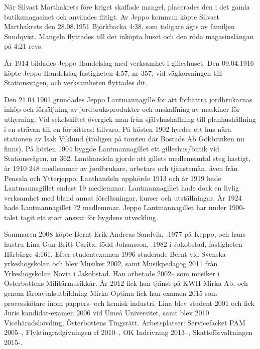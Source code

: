 När Silvast Marthakrets före kriget skaffade mangel, placerades den i det gamla butiksmagasinet och användes flitigt. Av Jeppo kommun köpte Silvast Marthakrets den 28.08.1951 Björkbacka 4:38, som tidigare ägts av familjen Sundqvist. Mangeln flyttades till det inköpta huset och den röda magasinslängan på 4:21 revs.


År 1914 bildades Jeppo Handelslag med verksamhet i gilleshuset. Den 09.04.1916 köpte Jeppo Handelslag fastigheten 4:57, nr 357, vid vägkorsningen till Stationsvägen, och verksamheten flyttades dit.


Den 21.04.1901 grundades Jeppo Lantmannagille för att förbättra jordbrukarnas inköp och försäljning av jordbruksprodukter och anskaffning av maskiner för uthyrning. Vid sekelskiftet övergick man från självhushållning till planhushållning i en strävan till en förbättrad tillvaro. På hösten 1902 hyrdes ett hus nära stationen av Isak Viklund	(troligen på tomten där Bostads Ab Gökbrinken nu finns). På hösten 1904 byggde Lantmannagillet ett gilleshus/butik vid Stationsvägen, 	nr 362. Lanthandeln gjorde att gillets medlemsantal steg hastigt, år 1910	248 medlemmar av jordbrukare, arbetare och tjänstemän, även från 	Pensala och Ytterjeppo. Lanthandeln upphörde 1913 och år 1919 hade 	Lantmannagillet endast 19 medlemmar. Lantmannagillet hade dock en livlig verksamhet med bland annat föreläsningar, kurser och 	utställningar. År 1924 hade Lantmannagillet 72 medlemmar. Jeppo	Lantmannagillet har under 1900-talet tagit ett stort ansvar för bygdens utveckling.




Sommaren 2008 köpte Bernt Erik Andreas Sandvik, .1977 på Keppo, och hans hustru Lina Gun-Britt Carita, född Johansson, .1982 i Jakobstad, fastigheten Härbärge 4:161. Efter studentexamen 1996 studerade Bernt vid Svenska yrkeshögskolan och blev Musiker 2002, samt Musikpedagog 2011 från Yrkeshögskolan Novia 	i Jakobstad. Han arbetade 2002-- som musiker i Österbottens Militärmusikkår. År 2012 fick han tjänst på KWH-Mirka Ab, och genom 	läroavtalsutbildning Mirka-Optima fick han examen 2015 som processkötare inom pappers- och kemisk industri. Lina blev student 2001 och fick Juris kandidat-examen 2006 vid Umeå Universitet, samt	blev 2010 Vicehäradshövding, Österbottens Tingsrätt. Arbetsplatser: Servicefacket PAM 2005--, Flyktingrådgivningen rf 2010--, OK Indrivning 2013--, Skatteförvaltningen 2015-.
\begin{jhchildren}
  \item {}
  \item {}
  \item {}
  \item {}
\end{jhchildren}


